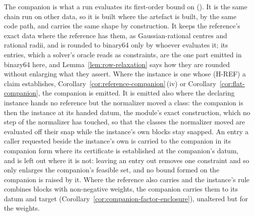 The companion is what a run evaluates its first-order bound on
(). It is the same
chain run on other data, so it is built where the artefact is built, by the
same code path, and carries the same shape by construction. It keeps the
reference's exact data where the reference has them, as Gaussian-rational
centres and rational radii, and is rounded to binary64 only by whoever
evaluates it; its entries, which a solver's oracle reads as constraints, are
the one part emitted in binary64 here, and Lemma~\ref{lem:row-relaxation}
says how they are rounded without enlarging what they assert. Where the
instance is one whose (H-REF) a claim establishes, Corollary~\ref{cor:reference-companion}\,(iv)
or Corollary~\ref{cor:flat-companion}, the companion is emitted. It is
emitted also where the declaring instance hands no reference but the
normalizer moved a class: the companion is then the instance at its handed
datum, the module's exact construction, which no step of the normalizer has
touched, so that the classes the normalizer moved are evaluated off their
snap while the instance's own blocks stay snapped. An entry a caller
requested beside the instance's own is carried to the companion in its
companion form where its certificate is established at the companion's
datum, and is left out where it is not: leaving an entry out removes one
constraint and so only enlarges the companion's feasible set, and no bound
formed on the companion is raised by it. Where the reference also carries
 and the instance's rule combines blocks with non-negative
weights, the companion carries them to its datum and target
(Corollary~\ref{cor:companion-factor-enclosure}), unaltered but for the
weights.

